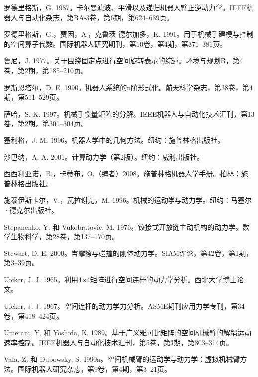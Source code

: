 \documentclass[10pt,a4paper]{book}
\theoremstyle{thmstyle} %
\theoremstyle{defstyle} %
\theoremstyle{prostyle} %
\begin{document}
罗德里格斯，G. 1987。卡尔曼滤波、平滑以及递归机器人臂正逆动力学。IEEE机器人与自动化杂志，第RA-3卷，第6期，第624–639页。



罗德里格斯，G.，贾因，A.，克鲁茨-德尔加多，K. 1991。用于机械手建模与控制的空间算子代数。国际机器人研究期刊，第10卷，第4期，第371–381页。



鲁尼，J. 1977。关于围绕固定点进行空间旋转表示的综述。环境与规划B，第4卷，第2期，第185–210页。



罗斯恩塔尔，D. E. 1990。机器人系统的n阶形式化。航天科学杂志，第38卷，第4期，第511–529页。



萨哈，S. K. 1997。机械手惯量矩阵的分解。IEEE机器人与自动化技术汇刊，第13卷，第2期，第301–304页。



塞利格，J. M. 1996。机器人学中的几何方法。纽约：施普林格出版社。



沙巴纳，A. A. 2001。计算动力学（第2版）。纽约：威利出版社。



西西利亚诺，B.，卡蒂布，O.（编者）2008。施普林格机器人学手册。柏林：施普林格出版社。



施泰伊斯卡尔，V.，瓦拉谢克，M. 1996。机械的运动学与动力学。纽约：马塞尔·德克尔出版社。



Stepanenko, Y. 和 Vukobratovic, M. 1976。铰接式开放链主动机构的动力学。数学生物科学，第28卷，第137–170页。



Stewart, D. E. 2000。含摩擦与碰撞的刚体动力学。SIAM评论，第42卷，第1期，第3–39页。



Uicker, J. J. 1965。利用4×4矩阵进行空间连杆的动力学分析。西北大学博士论文。



Uicker, J. J. 1967。空间连杆的动力学力分析。ASME期刊应用力学专刊，第34卷，第418–424页。



Umetani, Y. 和 Yoshida, K. 1989。基于广义雅可比矩阵的空间机械臂的解耦运动速率控制。IEEE机器人与自动化技术汇刊，第5卷，第3期，第303–314页。



Vafa, Z. 和 Dubowsky, S. 1990a。空间机械臂的运动学与动力学：虚拟机械臂方法。国际机器人研究杂志，第9卷，第4期，第3–21页。
\end{document}
